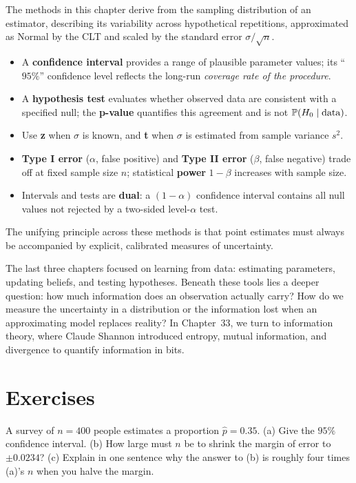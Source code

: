 \begin{aestheticbox}
The methods in this chapter derive from the sampling distribution of an estimator,
describing its variability across hypothetical repetitions, approximated as Normal by the
CLT and scaled by the standard error $\sigma/\sqrt n$.
\begin{itemize}
  \item A \textbf{confidence interval} provides a range of plausible parameter values; its ``$95\%$''
  confidence level reflects the long-run \emph{coverage rate of the procedure}.
  \item A \textbf{hypothesis test} evaluates whether observed data are consistent with a specified null; the
  \textbf{p-value} quantifies this agreement and is not $\operatorname{\mathbb{P}}(H_0\mid\text{data})$.
  \item Use \textbf{z} when $\sigma$ is known, and \textbf{t} when $\sigma$ is estimated from sample variance $s^2$.
  \item \textbf{Type I error} ($\alpha$, false positive) and \textbf{Type II error} ($\beta$, false negative)
  trade off at fixed sample size $n$; statistical \textbf{power} $1-\beta$ increases with sample size.
  \item Intervals and tests are \textbf{dual}: a $(1-\alpha)$ confidence interval contains all null values
  not rejected by a two-sided level-$\alpha$ test.
\end{itemize}
The unifying principle across these methods is that point estimates must always be accompanied
by explicit, calibrated measures of uncertainty.
\end{aestheticbox}

The last three chapters focused on learning from data: estimating
parameters, updating beliefs, and testing hypotheses. Beneath these tools lies
a deeper question: how much information does an observation actually carry? How
do we measure the uncertainty in a distribution or the information lost when an
approximating model replaces reality? In Chapter~33, we turn to information
theory, where Claude Shannon introduced entropy, mutual information, and
divergence to quantify information in bits.

\section{Exercises}
\label{ch32:exercises}

\begin{exercise}
A survey of $n=400$ people estimates a proportion $\hat p = 0.35$. (a) Give the $95\%$
confidence interval. (b) How large must $n$ be to shrink the margin of error to $\pm
0.0234$? (c) Explain in one sentence why the answer to (b) is roughly four times (a)'s $n$
when you halve the margin.
\end{exercise}

